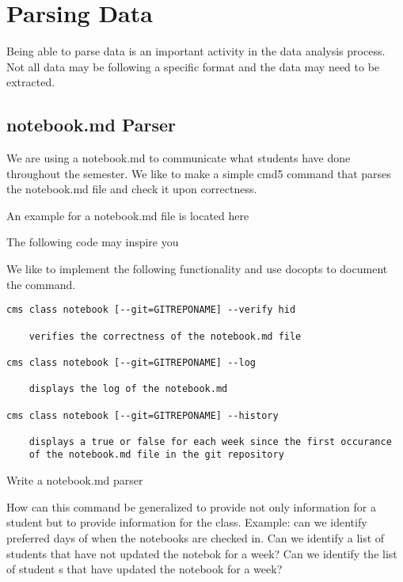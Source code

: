 \section{Parsing Data}

Being able to parse data is an important activity in the data analysis
process. Not all data may be following a specific format and the data
may need to be extracted.


\subsection{notebook.md Parser}

We are using a notebook.md to communicate what students have done
throughout the semester. We like to make a simple cmd5 command that
parses the notebook.md file and check it upon correctness.

An example for a notebook.md file is located here 


The following code may inspire you


We like to implement the following functionality and use docopts to
document the command.

\begin{lstlisting}
cms class notebook [--git=GITREPONAME] --verify hid

    verifies the correctness of the notebook.md file

cms class notebook [--git=GITREPONAME] --log

    displays the log of the notebook.md

cms class notebook [--git=GITREPONAME] --history

    displays a true or false for each week since the first occurance
    of the notebook.md file in the git repository
\end{lstlisting}

\begin{exercise}\label{E:notebook-md.1}
  Write a notebook.md parser
\end{exercise}

\begin{exercise}\label{E:notebook-md.2}
  How can this command be generalized to provide not only information
  for a student but to provide information for the class. Example: can
  we identify preferred days of when the notebooks are checked in. Can
  we identify a list of students that have not updated the notebok for
  a week?  Can we identify the list of student s that have updated the
  notebook for a week? 
\end{exercise}


